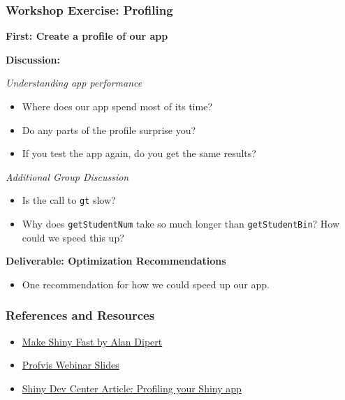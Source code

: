 \documentclass[]{book}
\providecommand{\tightlist}{%
  \setlength{\itemsep}{0pt}\setlength{\parskip}{0pt}}
\theoremstyle{definition}
\theoremstyle{definition}
\theoremstyle{definition}
\theoremstyle{remark}
\begin{document}
\hypertarget{workshop-exercise-profiling}{%
\subsubsection{Workshop Exercise:
Profiling}\label{workshop-exercise-profiling}}

\textbf{First: Create a profile of our app}

\textbf{Discussion:}

\emph{Understanding app performance}

\begin{itemize}
\tightlist
\item
  Where does our app spend most of its time?
\item
  Do any parts of the profile surprise you?
\item
  If you test the app again, do you get the same results?
\end{itemize}

\emph{Additional Group Discussion}

\begin{itemize}
\tightlist
\item
  Is the call to \texttt{gt} slow?
\item
  Why does \texttt{getStudentNum} take so much longer than
  \texttt{getStudentBin}? How could we speed this up?
\end{itemize}

\textbf{Deliverable: Optimization Recommendations}

\begin{itemize}
\tightlist
\item
  One recommendation for how we could speed up our app.
\end{itemize}

\hypertarget{references-and-resources}{%
\subsubsection{References and
Resources}\label{references-and-resources}}

\begin{itemize}
\tightlist
\item
  \href{https://tailrecursion.com/slides/fast-shiny/\#/title-slide}{Make
  Shiny Fast by Alan Dipert}
\item
  \href{https://github.com/rstudio/webinars/blob/master/26-Profiling/Profiling.pdf}{Profvis
  Webinar Slides}
\item
  \href{http://shiny.rstudio.com/articles/profiling.html}{Shiny Dev
  Center Article: Profiling your Shiny app}
\end{itemize}
\end{document}
